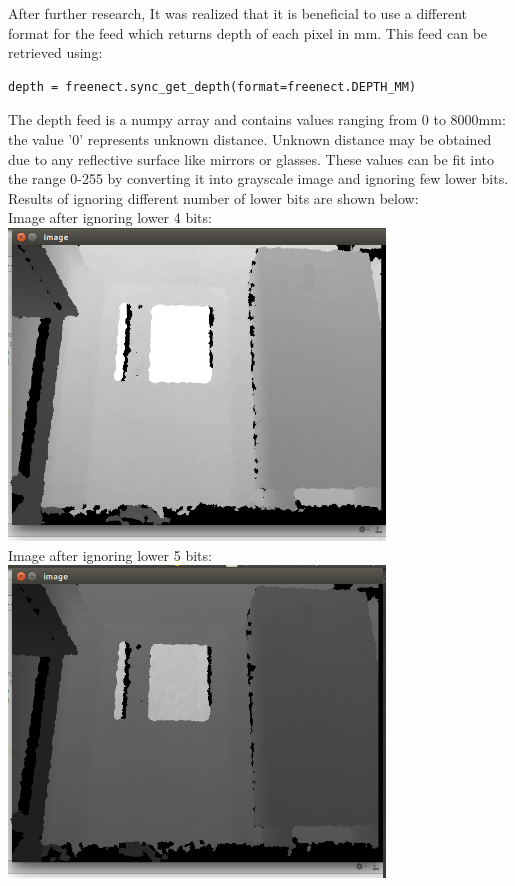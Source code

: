 \documentclass{report}
\begin{document}
After further research, It was realized that it is beneficial to use a different format for the feed which returns depth of each pixel 
in mm. This feed can be retrieved using: \\
\begin{lstlisting}
depth = freenect.sync_get_depth(format=freenect.DEPTH_MM)
\end{lstlisting}

The depth feed is a numpy array and contains values ranging from 0 to 8000mm: the value '0' represents unknown distance. Unknown distance may be 
obtained due to any reflective surface like mirrors or glasses. These values can be fit into the range 0-255 by converting it 
into grayscale image and ignoring few lower bits. Results of ignoring different number of lower bits are shown below: \pagebreak
\\
Image after ignoring lower 4 bits: \\
\includegraphics[width = 10cm]{d_4bit.png} \\
Image after ignoring lower 5 bits: \\
\includegraphics[width = 10cm]{d_5bit.png} \\
\pagebreak
\end{document}
